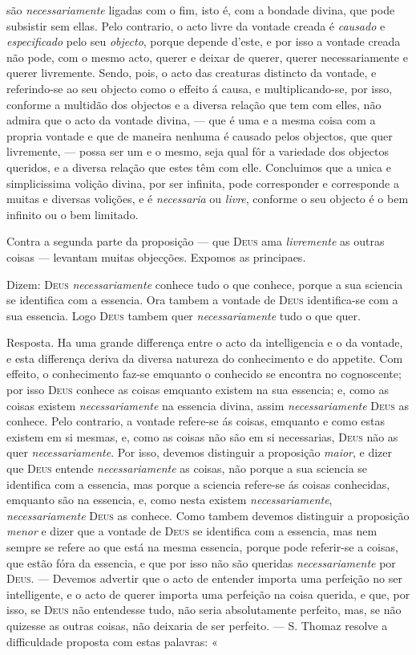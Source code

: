 são \emph{necessariamente} ligadas com o fim, isto é, com a bondade divina, que pode subsistir sem ellas. Pelo contrario, o acto livre da vontade creada é \emph{causado} e \emph{especificado} pelo seu \emph{objecto}, porque depende d'este, e por isso a vontade creada não pode, com o mesmo acto, querer e deixar de querer, querer necessariamente e querer livremente. Sendo, pois, o acto das creaturas distincto da vontade, e referindo-se ao seu objecto como o effeito á causa, e multiplicando-se, por isso, conforme a multidão dos objectos e a diversa relação que tem com elles, não admira que o acto da vontade divina, --- que é uma e a mesma coisa com a propria vontade e que de maneira nenhuma é causado pelos objectos, que quer livremente, --- possa ser um e o mesmo, seja qual fôr a variedade dos objectos queridos, e a diversa relação que estes têm com elle. Concluimos que a unica e simplicissima volição divina, por ser infinita, pode corresponder e corresponde a muitas e diversas volições, e é \emph{necessaria} ou \emph{livre}, conforme o seu objecto é o bem infinito ou o bem limitado.\par Contra a segunda parte da proposição --- que \textsc{Deus} ama \emph{livremente} as outras coisas --- levantam muitas objecções. Expomos as principaes.\par Dizem: \textsc{Deus} \emph{necessariamente} conhece tudo o que conhece, porque a sua sciencia se identifica com a essencia. Ora tambem a vontade de \textsc{Deus} identifica-se com a sua essencia. Logo \textsc{Deus} tambem quer \emph{necessariamente} tudo o que quer.\par Resposta. Ha uma grande differença entre o acto da intelligencia e o da vontade, e esta differença deriva da diversa natureza do conhecimento e do appetite. Com effeito, o conhecimento faz-se emquanto o conhecido se encontra no cognoscente; por isso \textsc{Deus} conhece as coisas emquanto existem na sua essencia; e, como as coisas existem \emph{necessariamente} na essencia divina, assim \emph{necessariamente} \textsc{Deus} as conhece. Pelo contrario, a vontade refere-se ás coisas, emquanto e como estas existem em si mesmas, e, como as coisas não são em si necessarias, \textsc{Deus} não as quer \emph{necessariamente}. Por isso, devemos distinguir a proposição \emph{maior}, e dizer que \textsc{Deus} entende \emph{necessariamente} as coisas, não porque a sua sciencia se identifica com a essencia, mas porque a sciencia refere-se ás coisas conhecidas, emquanto são na essencia, e, como nesta existem \emph{necessariamente}, \emph{necessariamente} \textsc{Deus} as conhece. Como tambem devemos distinguir a proposição \emph{menor} e dizer que a vontade de \textsc{Deus} se identifica com a essencia, mas nem sempre se refere ao que está na mesma essencia, porque pode referir-se a coisas, que estão fóra da essencia, e que por isso não são queridas \emph{necessariamente} por \textsc{Deus}. --- Devemos advertir que o acto de entender importa uma perfeição no ser intelligente, e o acto de querer importa uma perfeição na coisa querida, e que, por isso, se \textsc{Deus} não entendesse tudo, não seria absolutamente perfeito, mas, se não quizesse as outras coisas, não deixaria de ser perfeito. --- S. Thomaz resolve a difficuldade proposta com estas palavras: « 